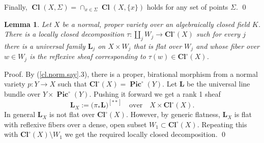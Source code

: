 \documentclass{amsart}
\newtheorem{lem}[thm]{Lemma}
\theoremstyle{definition}
\theoremstyle{remark}
\newcommand{\qtq}[1]{\quad\mbox{#1}\quad}
\newcommand{\pico}[0]{\operatorname{\mathbf{Pic}}^{\circ}}
\newcommand{\clos}[0]{\operatorname{\mathbf{Cl}^{\circ}}}
\newcommand{\cls}[0]{\operatorname{\mathbf{Cl}}}
\begin{document}
Finally,
$\cls(X, \Sigma)=\cap_{x\in \Sigma} \cls(X, \{x\})$ holds for any set of points $\Sigma$. \qed










\begin{lem} \label{pic.Z.X.lem.0}
Let $X$ be a normal, proper variety over an algebraically closed field $K$.
There is a locally closed decomposition  $\tau:\amalg_j W_j\to \clos(X)$ such for every $j$  there is a universal family  ${\mathbf L}_j$ on $X\times W_j$ that is flat  over  $W_j$ and whose fiber over $w\in W_j$ is the reflexive sheaf corresponding to
$\tau(w)\in \clos(X)$.  
\end{lem}

Proof. By (\ref{cl.norm.say}.3), there is a proper, birational morphism from a normal variety
$p:Y\to X$ such that $\clos(X)=\pico(Y)$. Let
${\mathbf L}$ be the universal line bundle over $Y\times \pico(Y)$.
Pushing it forward we get a rank 1  sheaf
$$
{\mathbf L}_X:=\bigl(\pi_*{\mathbf L}\bigr)^{[**]}\qtq{over} X\times \clos(X).
$$
In general $ {\mathbf L}_X$ is not flat over $\clos(X)$. However, by generic flatness, $ {\mathbf L}_X$ is  flat with reflexive fibers over a dense, open subset   $W_1\subset \clos(X)$. Repeating this with $\clos(X)\setminus W_1$ we get the required
locally closed decomposition. \qed




 
\end{document}

